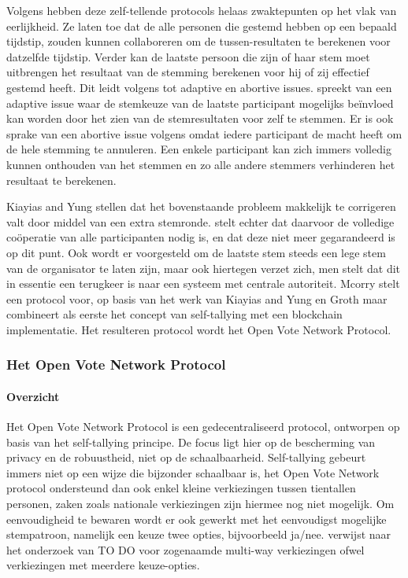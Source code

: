 		Volgens \textcite{McCorry2017}  hebben deze zelf-tellende protocols helaas zwaktepunten op het vlak van eerlijkheid. Ze laten toe dat de alle personen die gestemd hebben op een bepaald tijdstip, zouden kunnen collaboreren om de tussen-resultaten te berekenen voor datzelfde tijdstip. Verder kan de laatste persoon die zijn of haar stem moet uitbrengen het resultaat van de stemming berekenen voor hij of zij effectief gestemd heeft. Dit leidt volgens \textcite{McCorry2017} tot adaptive en abortive issues.  \textcite{McCorry2017} spreekt van een adaptive issue waar de stemkeuze van de laatste participant mogelijks beïnvloed kan worden door het zien van de stemresultaten voor zelf te stemmen. Er is ook sprake van een abortive issue volgens \textcite{McCorry2017} omdat iedere participant de macht heeft om de hele stemming te annuleren. Een enkele participant kan zich immers volledig kunnen onthouden van het stemmen en zo alle andere stemmers verhinderen het resultaat te berekenen. 
			
		Kiayias and Yung  stellen dat het bovenstaande probleem makkelijk te corrigeren valt door middel van een extra stemronde. \textcite{McCorry2017} stelt echter dat daarvoor de volledige coöperatie van alle participanten nodig is, en dat deze niet meer gegarandeerd is op dit punt. Ook wordt er voorgesteld om de laatste stem steeds een lege stem van de organisator te laten zijn, maar ook hiertegen verzet \textcite{McCorry2017} zich, men stelt dat dit in essentie een terugkeer is naar een systeem met centrale autoriteit.  Mcorry stelt een protocol voor, op basis van het werk van Kiayias and Yung en Groth maar combineert als eerste het concept van self-tallying met een blockchain implementatie. Het resulteren protocol wordt het Open Vote Network Protocol.
	
		\subsubsection{Het Open Vote Network Protocol}
			\paragraph*{Overzicht }
			Het Open Vote Network Protocol is een gedecentraliseerd protocol, ontworpen op basis van het self-tallying principe. De focus ligt hier op de bescherming van privacy en de robuustheid, niet op de schaalbaarheid. Self-tallying gebeurt immers niet op een wijze die bijzonder schaalbaar is, het  Open Vote Network protocol ondersteund dan ook enkel kleine verkiezingen tussen tientallen personen, zaken zoals nationale verkiezingen zijn hiermee nog niet mogelijk. Om eenvoudigheid te bewaren wordt er ook gewerkt met het eenvoudigst mogelijke stempatroon, namelijk een keuze twee opties, bijvoorbeeld ja/nee.  \textcite{McCorry2017} verwijst naar het onderzoek van TO DO voor zogenaamde multi-way verkiezingen ofwel verkiezingen met meerdere keuze-opties.
			
